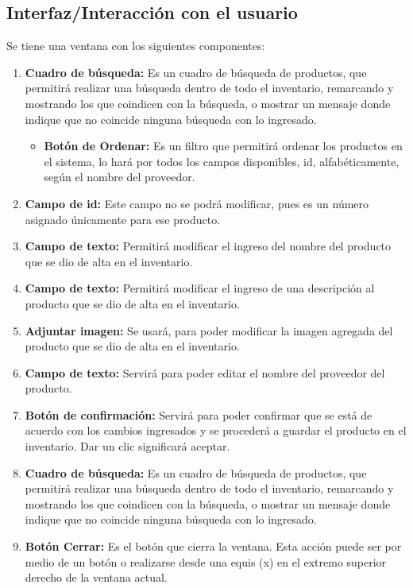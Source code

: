 \documentclass[a4paper,DIV=12]{scrreprt}
\begin{document}
\subsection*{Interfaz/Interacción con el usuario}

Se tiene una ventana con los siguientes componentes: 

\begin{enumerate}

	\item{\textbf{Cuadro de búsqueda:} Es un cuadro de búsqueda de productos, que permitirá realizar una búsqueda dentro de todo el inventario, remarcando y mostrando los que coindicen con la búsqueda, o mostrar un mensaje donde indique que no coincide ninguna búsqueda con lo ingresado.  }	
	\begin{itemize}
		\item{\textbf{Botón de Ordenar:} Es un filtro que permitirá ordenar los productos en el sistema, lo hará por todos los campos disponibles, id, alfabéticamente, según el nombre del proveedor. }
	\end{itemize}

	\item{\textbf{Campo de id:} Este campo no se podrá modificar, pues es un número asignado únicamente para ese producto.}
	\item{\textbf{Campo de texto:} Permitirá modificar el ingreso del nombre del producto que se dio de alta en el inventario.}
	\item{\textbf{Campo de texto:} Permitirá modificar el ingreso de una descripción al producto que se dio de alta en el inventario. }
	\item{\textbf{Adjuntar imagen:} Se usará, para poder modificar la imagen agregada del producto que se dio de alta en el inventario.}
	\item{\textbf{Campo de texto:} Servirá para poder editar el nombre del proveedor del producto.}
	\item{\textbf{Botón de confirmación:} Servirá para poder confirmar que se está de acuerdo con los cambios ingresados y se procederá a guardar el producto en el inventario. Dar un clic significará aceptar.}
	\item{\textbf{Cuadro de búsqueda:} Es un cuadro de búsqueda de productos, que permitirá realizar una búsqueda dentro de todo el inventario, remarcando y mostrando los que coindicen con la búsqueda, o mostrar un mensaje donde indique que no coincide ninguna búsqueda con lo ingresado.}
	\item{\textbf{Botón Cerrar:} Es el botón que cierra la ventana. Esta acción puede ser por medio de un botón o realizarse desde una equis (x) en el extremo superior derecho de la ventana actual.}

\end{enumerate}
\end{document}
